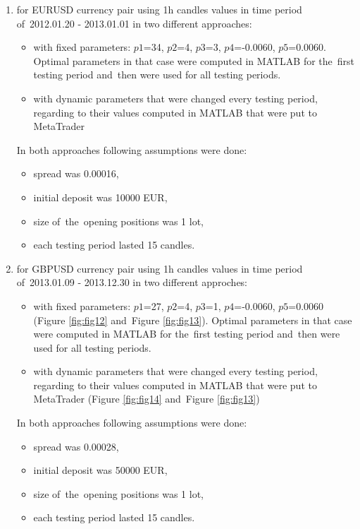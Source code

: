 \documentclass[runningheads,a4paper]{llncs}
\begin{document}
\begin{enumerate}
\item for EURUSD currency pair using 1h candles values in time period of~2012.01.20 - 2013.01.01 in two different approaches:
\begin{itemize}
\item with fixed parameters: $p1$=34, $p2$=4, $p3$=3, $p4$=-0.0060, $p5$=0.0060. Optimal parameters in that case were computed in MATLAB for the~first testing period and~then were used for all testing periods.
\item with dynamic parameters that were changed every testing period, regarding to their values computed in MATLAB that were put to MetaTrader 
\end{itemize}
In both approaches following assumptions were done:
\begin{itemize}
\item spread was 0.00016, 
\item initial deposit was 10000 EUR,
\item size of~the~opening positions was 1 lot,
\item each testing period lasted 15 candles.
\end{itemize}
\item for GBPUSD currency pair using 1h candles values in time period of~2013.01.09 - 2013.12.30 in two different approches:
\begin{itemize}
\item with fixed parameters: $p1$=27, $p2$=4, $p3$=1, $p4$=-0.0060, $p5$=0.0060 (Figure \ref{fig:fig12} and~Figure \ref{fig:fig13}). Optimal parameters in that case were computed in MATLAB for the~first testing period and~then were used for all testing periods.
\item with dynamic parameters that were changed every testing period, regarding to their values computed in MATLAB that were put to MetaTrader (Figure \ref{fig:fig14} and~Figure \ref{fig:fig13})
\end{itemize}
In both approaches following assumptions were done:
\begin{itemize}
\item spread was 0.00028, 
\item initial deposit was 50000 EUR,
\item size of~the~opening positions was 1 lot,
\item each testing period lasted 15 candles.
\end{itemize}
\end{enumerate}
\end{document}
